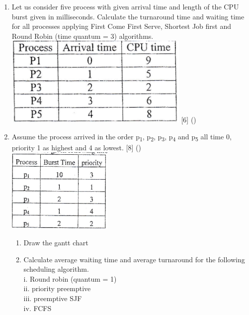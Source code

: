 \documentclass[12pt]{article}
\newcommand{\sub}[1]{\textsubscript{#1}}
\begin{document}
\begin{enumerate}
			\item Let us consider five process with given arrival time and length of the CPU burst given in milliseconds. Calculate the turnaround time and waiting time for all processes applying First Come First Serve, Shortest Job first and Round Robin (time quantum = 3) algorithms.\\
			\includegraphics[width=3.5in]{./pics/os_8}
			\hfill [6] ()
			
			\item Assume the process arrived in the order p\sub{1}, p\sub{2}, p\sub{3}, p\sub{4} and p\sub{5} all time 0, priority 1 as highest and 4 as lowest. \hfill [8] ()\\
			\includegraphics[width=2in]{./pics/os_7}
			\begin{enumerate}[noitemsep, topsep = 0pt, label = \alph*.]
				\item Draw the gantt chart
				\item Calculate average waiting time and average turnaround for the following scheduling algorithm.\\
				i. Round robin (quantum = 1)\\
				ii. priority preemptive\\
				iii. preemptive SJF\\
				iv. FCFS
			\end{enumerate}
			

\end{enumerate}
\end{document}
